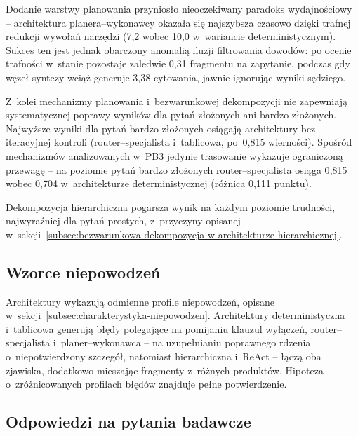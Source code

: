 Dodanie warstwy planowania przyniosło nieoczekiwany paradoks
wydajnościowy -- architektura planera--wykonawcy okazała się najszybsza
czasowo dzięki trafnej redukcji wywołań narzędzi (7{,}2 wobec 10,0 w~wariancie
deterministycznym). Sukces ten jest jednak obarczony anomalią iluzji filtrowania
dowodów: po ocenie trafności w~stanie pozostaje zaledwie 0{,}31 fragmentu na
zapytanie, podczas gdy węzeł syntezy wciąż generuje 3{,}38 cytowania, jawnie
ignorując wyniki sędziego.

Z~kolei mechanizmy planowania i~bezwarunkowej dekompozycji nie zapewniają
systematycznej poprawy wyników dla pytań złożonych ani bardzo złożonych.
Najwyższe wyniki dla pytań bardzo złożonych osiągają architektury bez
iteracyjnej kontroli (router--specjalista i~tablicowa, po~0{,}815 wierności).
Spośród mechanizmów analizowanych w~PB3 jedynie trasowanie wykazuje ograniczoną
przewagę -- na poziomie pytań bardzo złożonych router--specjalista osiąga
0{,}815 wobec 0{,}704 w~architekturze deterministycznej (różnica 0{,}111
punktu).

Dekompozycja hierarchiczna pogarsza wynik na każdym poziomie trudności,
najwyraźniej dla pytań prostych, z~przyczyny opisanej
w~sekcji~\ref{subsec:bezwarunkowa-dekompozycja-w-architekturze-hierarchicznej}.

\subsection{Wzorce niepowodzeń}\label{subsec:wzorce-niepowodzen}

Architektury wykazują odmienne profile niepowodzeń, opisane
w~sekcji~\ref{subsec:charakterystyka-niepowodzen}. Architektury
deterministyczna i~tablicowa generują błędy polegające na pomijaniu klauzul
wyłączeń, router--specjalista i~planer--wykonawca -- na uzupełnianiu poprawnego
rdzenia o~niepotwierdzony szczegół, natomiast hierarchiczna i~ReAct -- łączą
oba zjawiska, dodatkowo mieszając fragmenty z~różnych produktów. Hipoteza
o~zróżnicowanych profilach błędów znajduje pełne potwierdzenie.

\subsection{Odpowiedzi na pytania badawcze}\label{subsec:odpowiedzi-na-pytania-badawcze}

